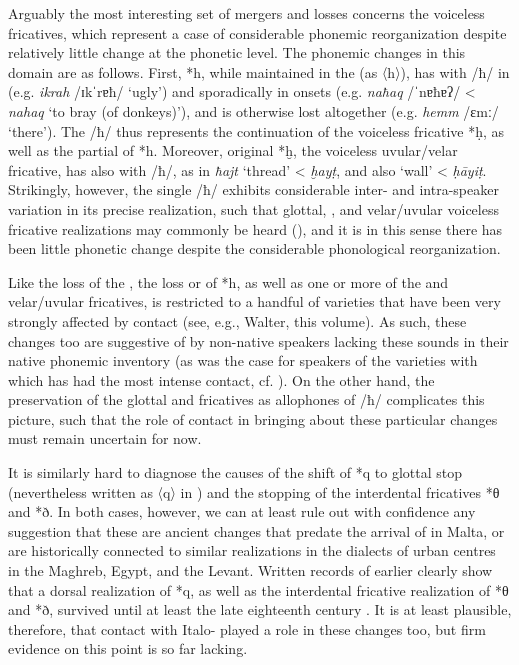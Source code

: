 \documentclass[output=paper]{langsci/langscibook}
\begin{document}
Arguably the most interesting set of mergers and losses concerns the voiceless fricatives, which represent a case of considerable phonemic reorganization despite relatively little change at the phonetic level. The phonemic changes in this domain are as follows. First, *h, while maintained in the  (as 〈h〉), has  with /ħ/ in  (e.g. \textit{ikrah} /ɪkˈrɐħ/ `ugly') and sporadically in onsets (e.g. \textit{naħaq} /ˈnɐħɐʔ/ < \textit{nahaq} `to bray (of donkeys)'), and is otherwise lost altogether (e.g. \textit{hemm} /ɛmː/ `there'). The   /ħ/ thus represents the continuation of the voiceless  fricative *\d{h}, as well as the partial  of *h. Moreover, original *ḫ, the voiceless uvular/velar fricative, has also  with /ħ/, as in \textit{ħajt} `thread' < \textit{ḫay\d{t}}, and also `wall' < \textit{\d{h}\={a}yi\d{t}}. Strikingly, however, the single   /ħ/ exhibits considerable inter- and intra-speaker variation in its precise realization, such that glottal, , and velar/uvular voiceless fricative realizations may commonly be heard (\citealt[301]{BorgAzzopardi-Alexander1997}), and it is in this sense there has been little phonetic change despite the considerable phonological reorganization.

Like the loss of the , the loss or  of *h, as well as one or more of the  and velar/uvular fricatives, is restricted to a handful of  varieties that have been very strongly affected by contact (see, e.g., Walter, this volume). As such, these changes too are suggestive of  by non-native speakers lacking these sounds in their native phonemic inventory (as was the case for speakers of the  varieties with which  has had the most intense contact, cf. \citealt[141--142] {Loporcaro2011}). On the other hand, the preservation of the glottal and  fricatives as allophones of /ħ/ complicates this picture, such that the role of contact in bringing about these particular changes must remain uncertain for now.

It is similarly hard to diagnose the causes of the shift of *q to glottal stop (nevertheless written as 〈q〉 in  ) and the stopping of the interdental fricatives *θ and *ð. In both cases, however, we can at least rule out with confidence any suggestion that these are ancient changes that predate the arrival of  in Malta, or are historically connected to similar realizations in the  dialects of urban centres in the Maghreb, Egypt, and the Levant. Written records of earlier  clearly show that a dorsal realization of *q, as well as the interdental fricative realization of *θ and *ð, survived until at least the late eighteenth century \citep{Avram2012,Avram2014Maltese}. It is at least plausible, therefore, that contact with Italo- played a role in these changes too, but firm evidence on this point is so far lacking.
\end{document}
